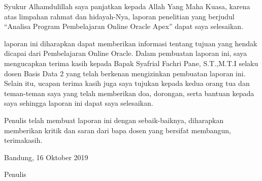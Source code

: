 \begin{acknowledgements}
Syukur Alhamdulillah saya panjatkan kepada Allah Yang Maha Kuasa, karena atas limpahan rahmat dan hidayah-Nya, laporan penelitian yang berjudul “Analisa Program Pembelajaran Online Oracle Apex” dapat saya selesaikan.

laporan ini diharapkan dapat memberikan informasi tentang tujuan yang hendak dicapai dari Pembelajaran Online Oracle. Dalam pembuatan laporan ini, saya mengucapkan terima kasih kepada Bapak Syafrial Fachri Pane, S.T.,M.T.I selaku dosen Basis Data 2 yang telah berkenan mengizinkan pembuatan laporan ini. Selain itu, ucapan terima kasih juga saya tujukan kepada kedua orang tua dan teman-teman saya yang telah memberikan doa, dorongan, serta bantuan kepada saya sehingga laporan ini dapat saya selesaikan.

Penulis telah membuat laporan ini dengan sebaik-baiknya, diharapkan memberikan kritik dan saran dari bapa dosen yang bersifat membangun, terimakasih.

\begin{raggedleft}

Bandung, 16 Oktober 2019

Penulis

\end{raggedleft}

\end{acknowledgements}